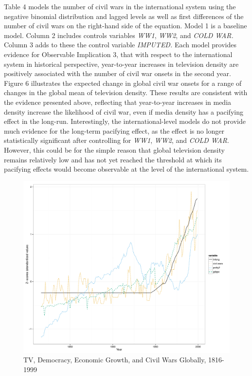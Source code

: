 \documentclass[11pt,article,oneside]{memoir}
\makeatletter
\def\maxwidth{\ifdim\Gin@nat@width>\linewidth\linewidth
\else\Gin@nat@width\fi}
\let\Oldincludegraphics\includegraphics
\renewcommand{\includegraphics}[1]{\Oldincludegraphics[width=\maxwidth]{#1}}
\makeatother
\begin{document}
Table 4 models the number of civil wars in the international system
using the negative binomial distribution and lagged levels as well as
first differences of the number of civil wars on the right-hand side of
the equation. Model 1 is a baseline model. Column 2 includes controls
variables \emph{WW1}, \emph{WW2}, and \emph{COLD WAR.} Column 3 adds to
these the control variable \emph{IMPUTED.} Each model provides evidence
for Observable Implication 3, that with respect to the international
system in historical perspective, year-to-year increases in television
density are positively associated with the number of civil war onsets in
the second year. Figure 6 illustrates the expected change in global
civil war onsets for a range of changes in the global mean of television
density. These results are consistent with the evidence presented above,
reflecting that year-to-year increases in media density increase the
likelihood of civil war, even if media density has a pacifying effect in
the long-run. Interestingly, the international-level models do not
provide much evidence for the long-term pacifying effect, as the effect
is no longer statistically significant after controlling for \emph{WW1},
\emph{WW2}, and \emph{COLD WAR}. However, this could be for the simple
reason that global television density remains relatively low and has not
yet reached the threshold at which its pacifying effects would become
observable at the level of the international system.

\begin{figure}[htbp]
\centering
\includegraphics{./media_civil_war_files/figure-markdown/longrunplot.pdf}
\caption{TV, Democracy, Economic Growth, and Civil Wars Globally,
1816-1999}
\end{figure}
\end{document}
